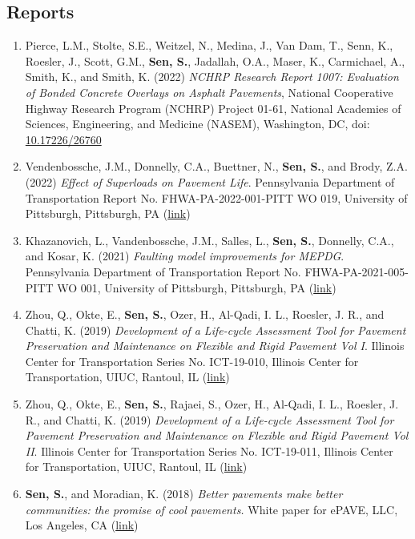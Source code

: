 \documentclass[12pt]{article}
\begin{document}
\hfill
\subsection*{Reports}
\begin{enumerate}
	\item Pierce, L.M., Stolte, S.E., Weitzel, N., Medina, J., Van Dam, T., Senn, K., Roesler, J., Scott, G.M., \textbf{Sen, S.}, Jadallah, O.A., Maser, K., Carmichael, A., Smith, K., and Smith, K. (2022) \textit{NCHRP Research Report 1007: Evaluation of Bonded Concrete Overlays on Asphalt Pavements}, National Cooperative Highway Research Program (NCHRP) Project 01-61, National Academies of Sciences, Engineering, and Medicine (NASEM), Washington, DC, doi: \href{http://doi.org/10.17226/26760}{10.17226/26760}
	\item Vendenbossche, J.M., Donnelly, C.A., Buettner, N., \textbf{Sen, S.}, and Brody, Z.A. (2022) \textit{Effect of Superloads on Pavement Life}. Pennsylvania Department of Transportation Report No. FHWA-PA-2022-001-PITT WO 019, University of Pittsburgh, Pittsburgh, PA (\href{https://www.penndot.pa.gov/ProjectAndPrograms/Planning/Research-And-Implementation/Documents/Superload\%20Effect\%20on\%20Pavement\%20Life.pdf}{link})
	\item Khazanovich, L., Vandenbossche, J.M., Salles, L., \textbf{Sen, S.}, Donnelly, C.A., and Kosar, K. (2021) \textit{Faulting model improvements for MEPDG}. Pennsylvania Department of Transportation Report No. FHWA-PA-2021-005-PITT WO 001, University of Pittsburgh, Pittsburgh, PA (\href{https://www.penndot.pa.gov/ProjectAndPrograms/Planning/Research-And-Implementation/Documents/Faulting\%20Model\%20Improvements\%20for\%20MEPDG.pdf}{link})
	\item Zhou, Q., Okte, E., \textbf{Sen, S.}, Ozer, H., Al-Qadi, I. L., Roesler, J. R., and Chatti, K. (2019) \textit{Development of a Life-cycle Assessment Tool for Pavement Preservation and Maintenance on Flexible and Rigid Pavement Vol I}. Illinois Center for Transportation Series No. ICT-19-010, Illinois Center for Transportation, UIUC, Rantoul, IL (\href{https://apps.ict.illinois.edu/projects/getfile.asp?id=8865}{link})
	\item Zhou, Q., Okte, E., \textbf{Sen, S.}, Rajaei, S., Ozer, H., Al-Qadi, I. L., Roesler, J. R., and Chatti, K. (2019) \textit{Development of a Life-cycle Assessment Tool for Pavement Preservation and Maintenance on Flexible and Rigid Pavement Vol II}. Illinois Center for Transportation Series No. ICT-19-011, Illinois Center for Transportation, UIUC, Rantoul, IL (\href{https://apps.ict.illinois.edu/projects/getfile.asp?id=8866}{link})
	\item \textbf{Sen, S.}, and Moradian, K. (2018) \textit{Better pavements make better communities: the promise of cool pavements.} White paper for ePAVE, LLC, Los Angeles, CA (\href{http://www.epavellc.com/wp-content/uploads/ePAVE-White-Paper.pdf}{link})
\end{enumerate}
\end{document}
